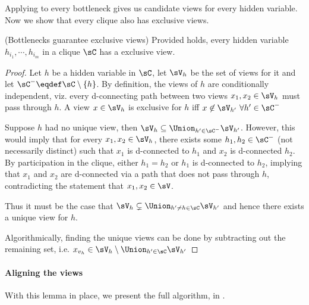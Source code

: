 Applying \TensorFactorize to every bottleneck gives us candidate views
  for every hidden variable. Now we show that every clique also has
  exclusive views.

\begin{lemma}(Bottlenecks guarantee exclusive views)
  Provided  holds, every hidden variable
    $h_{i_1}, \cdots, h_{i_m}$ in a clique $\sC$ has a exclusive view.
\end{lemma}
\begin{proof}
  Let $h$ be a hidden variable in $\sC$, let $\sV_{h}$ be the set of
    views for it and let $\sC^- \eqdef \sC \setminus \{h\}$.
  By definition, the views of $h$ are conditionally independent, viz.
    every d-connecting path between two views $x_1, x_2 \in \sV_h$ must pass through
    $h$.
  A view $x \in \sV_{h}$ is exclusive for $h$ iff $x \not\in \sV_{h'} ~ \forall h'
  \in \sC^-$

  Suppose $h$ had no unique view, then $\sV_{h} \subseteq \Union_{h' \in \sC^-} \sV_{h'}$. 
  However, this would imply that for every $x_1, x_2 \in \sV_{h}$, there
    exists some $h_1, h_2 \in \sC^-$ (not necessarily distinct) such that
    $x_1$ is d-connected to $h_1$ and $x_2$ is d-connected $h_2$.
  By participation in the clique, either $h_1 = h_2$ or $h_1$ is
    d-connected to $h_2$, implying that $x_1$ and $x_2$ are d-connected
    via a path that does not pass through $h$, contradicting the
    statement that $x_1, x_2 \in \sV$. 
    
  Thus it must be the case that $\sV_{h} \subsetneq \Union_{h' \neq
    h \in \sC} \sV_{h'}$ and hence there exists a unique view for $h$.

  Algorithmically, finding the unique views can be done by subtracting
    out the remaining set, i.e. $x_{v_h} \in \sV_h \setminus \Union_{h'
    \in \sC} \sV_{h'}$
\end{proof}

\paragraph{Aligning the views}

With this lemma in place, we present the full algorithm, \LearnMarginals
in .

